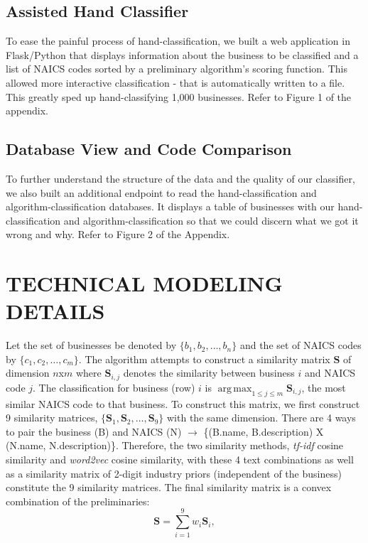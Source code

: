 \documentclass[letterpaper, 10 pt, conference]{IEEEtran}
\DeclareMathOperator*{\argmax}{arg\,max}
\newcommand{\matr}[1]{\mathbf{#1}}
\begin{document}
\subsection{Assisted Hand Classifier}

To ease the painful process of hand-classification, we built a web application in Flask/Python that displays information about the business to be classified and a list of NAICS codes sorted by a preliminary algorithm's scoring function. This allowed more interactive classification - that is automatically written to a file. This greatly sped up hand-classifying 1,000 businesses. Refer to Figure 1 of the appendix.

\subsection{Database View and Code Comparison}

To further understand the structure of the data and the quality of our classifier, we also built an additional endpoint to read the hand-classification and algorithm-classification databases. It displays a table of businesses with our hand-classification and algorithm-classification so that we could discern what we got it wrong and why. Refer to Figure 2 of the Appendix.

\section{TECHNICAL MODELING DETAILS}

Let the set of businesses be denoted by $\{b_1,b_2,\dots,b_n\}$ and the set of NAICS codes by $\{c_1,c_2,\dots,c_m\}$. The algorithm attempts to construct a similarity matrix $\matr{S}$ of dimension $n$x$m$ where $\matr{S}_{i,j}$ denotes the similarity between business $i$ and NAICS code $j$. The classification for business (row) $i$ is $\argmax_{1 \leq j \leq m} \matr{S}_{i,j}$, the most similar NAICS code to that business. To construct this matrix, we first construct 9 similarity matrices, $\{\matr{S}_1,\matr{S}_2,\dots,\matr{S}_9\}$ with the same dimension. There are 4 ways to pair the business (B) and NAICS (N) $\rightarrow$ \{(B.name, B.description) X (N.name, N.description)\}. Therefore, the two similarity methods, \textit{tf-idf} cosine similarity and \textit{word2vec} cosine similarity, with these 4 text combinations as well as a similarity matrix of 2-digit industry priors (independent of the business) constitute the 9 similarity matrices. The final similarity matrix is a convex combination of the preliminaries: \[ \matr{S} = \sum_{i=1}^9 w_i \matr{S}_i, \]
\end{document}

